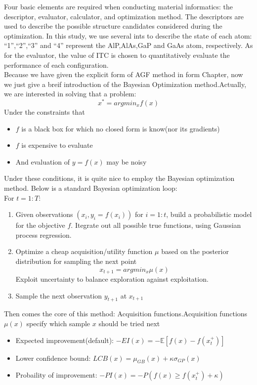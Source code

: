 \indent Four basic elements are required when conducting
material informatics: the descriptor, evaluator, calculator,
and optimization method. The descriptors are used to
describe the possible structure candidates considered during the optimization. 
In this study, we use several ints to
describe the state of each atom: “1”,“2”,“3” and “4” represent the
AlP,AlAs,GaP and GaAs atom, respectively. As for the evaluator, the value
of ITC is chosen to quantitatively evaluate the performance
of each configuration.\\
\indent Because we have given the explicit form of AGF method in form Chapter, now we just give a breif introduction of the Bayesian Optimization method.Actually, we are interested in solving that a problem:
\begin{equation*}
x^{*}=arg min_x f(x)
\end{equation*}
Under the constraints that
\begin{itemize}
	\item $f$ is a black box for which no closed form is know(nor its gradients)
	\item $f$ is expensive to evaluate
	\item And evaluation of $y=f(x)$ may be noisy
\end{itemize}
Under these conditions, it is quite nice to employ the Bayesian optimization method. Below is a standard Bayesian optimization loop\cite{snoek2012practical}:\\
For $t=1:T$:
\begin{enumerate}
	\item Given observations $(x_i,y_i=f(x_i))$ for $i=1:t$, build a probabilistic model for the objective $f$. Itegrate out all possible true functions, using Gaussian process regression\cite{rasmussen2006gaussian}. 
	\item Optimize a cheap acquisition/utility function $\mu$ based on the posterior distribution for sampling the next point
	\begin{equation*}
	x_{t+1}=arg min_x \mu(x)
	\end{equation*}
	Exploit uncertainty to balance exploration against exploitation.
	\item Sample the next observation $y_{t+1}$ at $x_{t+1}$
\end{enumerate}
Then comes the core of this method: Acquisition functions\cite{brochu2010tutorial}.Acquisition functions $\mu(x)$ specify which sample $x$ should be tried next
\begin{itemize}
	\item Expected improvement(default): $-EI(x)=-\mathbb{E}[f(x)-f(x^{+}_t)]$
	\item Lower confidence bound: $LCB(x)=\mu_{GB}(x)+\kappa \sigma_{GP}(x)$
	\item Probaility of improvement: $-PI(x)=-P(f(x) \geq f(x^{+}_t)+\kappa)$
\end{itemize}
